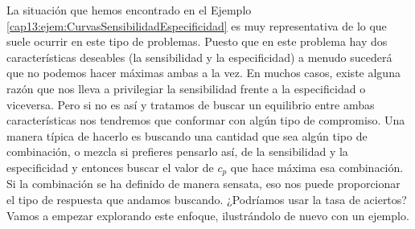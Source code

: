 La situación que hemos encontrado en el Ejemplo \ref{cap13:ejem:CurvasSensibilidadEspecificidad} es muy representativa de lo que suele ocurrir en este tipo de problemas.  Puesto que en este problema hay dos características deseables (la sensibilidad y la especificidad) a menudo sucederá que no podemos hacer máximas ambas a la vez. En muchos casos, existe alguna razón que nos lleva a privilegiar la sensibilidad frente a la especificidad o viceversa. Pero si no es así y tratamos de buscar un equilibrio entre ambas características nos tendremos que conformar con algún tipo de compromiso. Una manera típica de hacerlo es buscando una cantidad que sea algún tipo de  combinación, o mezcla si prefieres pensarlo así, de la sensibilidad y la especificidad  y entonces buscar el valor de $c_p$ que hace máxima esa combinación. Si la combinación se ha definido de manera sensata, eso nos puede proporcionar el tipo de respuesta que andamos buscando.  ¿Podríamos usar la tasa de aciertos? Vamos a empezar explorando este enfoque, ilustrándolo de nuevo con un ejemplo.

